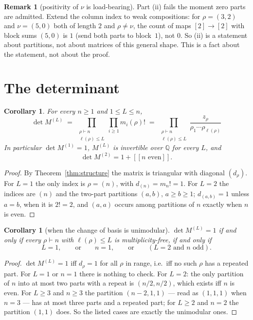 \documentclass[11pt]{article}
\newtheorem{corollary}[theorem]{Corollary}
\theoremstyle{definition}
\newtheorem{remark}[theorem]{Remark}
\newcommand{\bb}[1]{[\![#1]\!]}
\begin{document}
\begin{remark}[positivity of $\nu$ is load-bearing]\label{rem:loadbearing}
Part (ii) fails the moment zero parts are admitted. Extend the column index to weak compositions:
for $\rho=(3,2)$ and $\nu=(5,0)$ both of length $2$ and $\rho\ne\nu$, the count of maps
$[2]\to[2]$ with block sums $(5,0)$ is $1$ (send both parts to block~$1$), not $0$. So (ii) is a
statement about partitions, not about matrices of this general shape. This is a fact about the
statement, not about the proof.
\end{remark}

\section{The determinant}

\begin{corollary}\label{cor:det}
For every $n\ge1$ and $1\le L\le n$,
\[
  \boxed{\ \det M^{(L)}\;=\;\prod_{\substack{\rho\vdash n\\ \ell(\rho)\le L}} \prod_{i\ge1}m_i(\rho)!
  \;=\;\prod_{\substack{\rho\vdash n\\ \ell(\rho)\le L}}\frac{z_\rho}{\rho_1\cdots\rho_{\ell(\rho)}}\ }
\]
In particular $\det M^{(1)}=1$, $M^{(L)}$ is invertible over $\mathbb{Q}$ for every $L$, and
\[
  \det M^{(2)}=1+\bb{n\text{ even}} .
\]
\end{corollary}

\begin{proof}
By Theorem~\ref{thm:structure} the matrix is triangular with diagonal $(d_\rho)$. For $L=1$ the only
index is $\rho=(n)$, with $d_{(n)}=m_n!=1$. For $L=2$ the indices are $(n)$ and the two-part
partitions $(a,b)$, $a\ge b\ge1$; $d_{(a,b)}=1$ unless $a=b$, when it is $2!=2$, and $(a,a)$ occurs
among partitions of $n$ exactly when $n$ is even.
\end{proof}

\begin{corollary}[when the change of basis is unimodular]\label{cor:unimod}
$\det M^{(L)}=1$ if and only if every $\rho\vdash n$ with $\ell(\rho)\le L$ is multiplicity-free,
if and only if
\[
  L=1,\qquad\text{or}\qquad n=1,\qquad\text{or}\qquad (L=2 \text{ and } n \text{ odd}).
\]
\end{corollary}

\begin{proof}
$\det M^{(L)}=1$ iff $d_\rho=1$ for all $\rho$ in range, i.e.\ iff no such $\rho$ has a repeated
part. For $L=1$ or $n=1$ there is nothing to check. For $L=2$: the only partition of $n$ into at most
two parts with a repeat is $(n/2,n/2)$, which exists iff $n$ is even. For $L\ge3$ and $n\ge3$ the
partition $(n-2,1,1)$ --- read as $(1,1,1)$ when $n=3$ --- has at most three parts and a repeated
part; for $L\ge2$ and $n=2$ the partition $(1,1)$ does. So the listed cases are exactly the
unimodular ones.
\end{proof}
\end{document}
